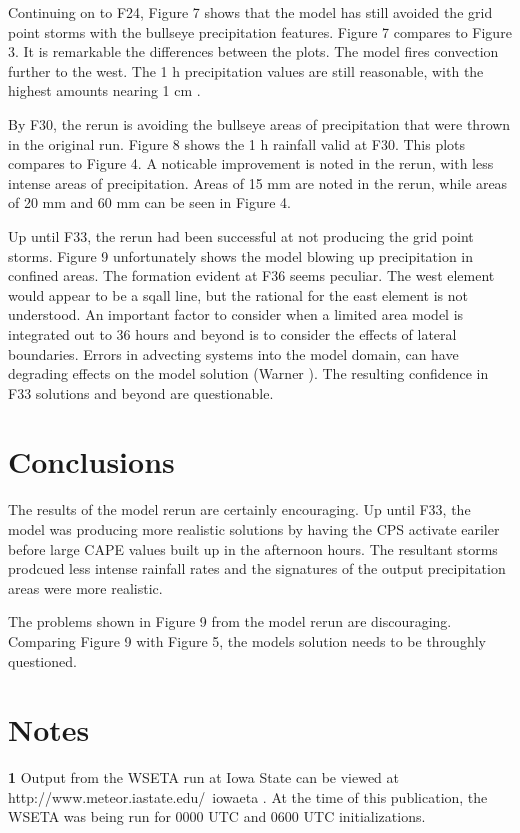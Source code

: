 \documentclass{article}
\begin{document}
\begin{multicols}{2}
Continuing on to F24, Figure 7 shows that the model has still avoided the grid point storms with the bullseye precipitation features.  Figure 7 compares to Figure 3.  It is remarkable the differences between the plots. The model fires convection further to the west.  The 1 h precipitation values are still reasonable, with the highest amounts nearing 1 cm \hr.

By F30, the rerun is avoiding the bullseye areas of precipitation that were thrown in the original run.  Figure 8 shows the 1 h rainfall valid at F30.  This plots compares to Figure 4.  A noticable improvement is noted in the rerun, with less intense areas of precipitation.  Areas of 15 mm are noted in the rerun, while areas of 20 mm and 60 mm can be seen in Figure 4. 

Up until F33, the rerun had been successful at not producing the grid point storms.  Figure 9 unfortunately shows the model blowing up precipitation in confined areas.  The formation evident at F36 seems peculiar.  The west element would appear to be a sqall line, but the rational for the east element is not understood.  An important factor to consider when a limited area model is integrated out to 36 hours and beyond is to consider the effects of lateral boundaries.  Errors in advecting systems into the model domain, can have degrading effects on the model solution (Warner ).
The resulting confidence in F33 solutions and beyond are questionable.

\section{Conclusions}
The results of the model rerun are certainly encouraging.  Up until F33, the model was producing more realistic solutions by having the CPS activate eariler before large CAPE values built up in the afternoon hours.  The resultant storms prodcued less intense rainfall rates and the signatures of the output precipitation areas were more realistic.

The problems shown in Figure 9 from the model rerun are discouraging.  Comparing Figure 9 with Figure 5, the models solution needs to be throughly questioned.

\section{Notes}
\textbf{1}  Output from the WSETA run at Iowa State can be viewed at http://www.meteor.iastate.edu/~iowaeta .  At the time of this publication, the WSETA was being run for 0000 UTC and 0600 UTC initializations.


\end{multicols}
\end{document}
